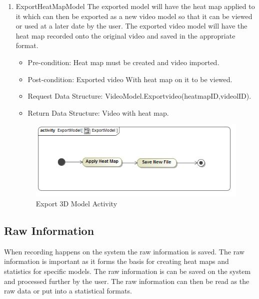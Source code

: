 \begin{enumerate}
			
			
			\item{ExportHeatMapModel}
			The exported model will have the heat map applied to it which can then be exported as a new video model so that it can be viewed or used at a later date by the user. The exported video model will have the heat map recorded onto the original video and saved in the appropriate format.
			\begin{itemize}
				\item Pre-condition: Heat map must be created and video imported.
				\item Post-condition: Exported video With heat map on it to be viewed.
				\item Request Data Structure: VideoModel.Exportvideo(heatmapID,videolID).
				\item Return Data Structure: Video with heat map.
			\end{itemize}
		\begin{figure}[!ht]
			\centering
			\includegraphics[scale=0.5]{Diagrams/Activity_Diagram__ExportModel__ExportModel.png}
			\caption{Export 3D Model Activity}
		\end{figure}
	
		\end{enumerate}
		
\subsection{Raw Information}
When recording happens on the system the raw information is saved. The raw information is important as it forms the basis for creating heat maps and statistics for specific models. The raw information is can be saved on the system and processed further by the user. The raw information can then be read as the raw data or put into a statistical formats.
\newline

